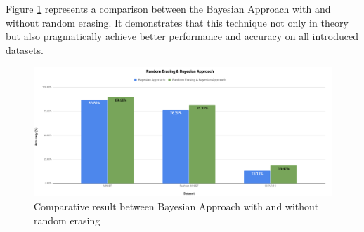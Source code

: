 Figure \ref{fig:random_erasiong_result} represents a comparison between the Bayesian Approach with and without random erasing. It demonstrates that this technique not only in theory but also pragmatically achieve better performance and accuracy on all introduced datasets.  


\begin{figure}
  \centering
  \label{fig:random_erasiong_result}
  \includegraphics[width=1\textwidth]{fig/contribution/random-erasing-result}
  \caption{Comparative result between Bayesian Approach with and without random erasing}
\end{figure}